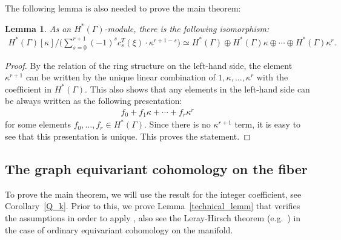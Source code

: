 \documentclass[12pt]{amsart}
\newtheorem{lemma}[theorem]{Lemma}
\theoremstyle{definition}
\theoremstyle{remark}
\numberwithin{equation}{section}
\begin{document}
The following lemma is also needed to prove the main theorem:
\begin{lemma}
\label{free-module}
As an $H^{*}(\Gamma)$-module, there is the following isomorphism:
\begin{align*}
H^{*}(\Gamma)[\kappa]\big/\biggl( \sum_{s=0}^{r+1} (-1)^{s}c_{s}^{T}(\xi) \cdot \kappa^{r+1-s} \biggr)\simeq
H^{*}(\Gamma)\oplus H^{*}(\Gamma)\kappa\oplus \cdots \oplus H^{*}(\Gamma)\kappa^{r}.
\end{align*}
\end{lemma}
\begin{proof}
By the relation of the ring structure on the left-hand side,
the element $\kappa^{r+1}$ can be written by the unique linear combination of $1, \kappa,\ldots, \kappa^{r}$ with the coefficient in $H^{*}(\Gamma)$.
This also shows that any elements in the left-hand side can be always written as the following presentation:
\begin{align*}
f_{0}+f_{1}\kappa+\cdots +f_{r}\kappa^{r}
\end{align*}
for some elements $f_{0},\ldots, f_{r}\in H^{*}(\Gamma)$.
Since there is no $\kappa^{r+1}$ term,
it is easy to see that this presentation is unique.
This proves the statement.
\end{proof}

\subsection{The graph equivariant cohomology on the fiber}
\label{sect:5.3}

To prove the main theorem, we will use the result \cite[Theorem 3.5]{GSZ} for the integer coefficient, see Corollary~\ref{Q_k}.
Prior to this, we prove Lemma~\ref{technical_lemm} that verifies the assumptions in order to apply \cite[Theorem 3.5]{GSZ}, also see the Leray-Hirsch theorem (e.g.~\cite[Theorem 4D.1]{H})
in the case of ordinary equivariant cohomology on the manifold.
\end{document}
